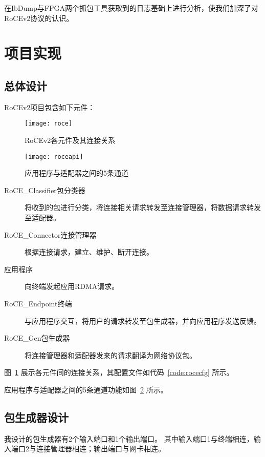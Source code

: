 在IbDump与FPGA两个抓包工具获取到的日志基础上进行分析，使我们加深了对RoCEv2协议的认识。

\section{项目实现}
\subsection{总体设计}
RoCEv2项目包含如下元件：
\begin{figure}[htbp]
\centering
\texttt{[image: roce]}
\caption{RoCEv2各元件及其连接关系} \label{fig:roce}
\end{figure}

\begin{figure}[htbp]
\centering

\end{figure}

\begin{figure}[htbp]
\centering
\texttt{[image: roceapi]}
\caption{应用程序与适配器之间的5条通道} \label{fig:roceapi}
\end{figure}

\begin{description}
\item[RoCE\_Classifier包分类器]将收到的包进行分类，将连接相关请求转发至连接管理器，将数据请求转发至适配器。
\item[RoCE\_Connector连接管理器]根据连接请求，建立、维护、断开连接。
\item[应用程序]向终端发起应用RDMA请求。
\item[RoCE\_Endpoint终端]与应用程序交互，将用户的请求转发至包生成器，并向应用程序发送反馈。
\item[RoCE\_Gen包生成器]将连接管理器和适配器发来的请求翻译为网络协议包。
\end{description}

图~\ref{fig:roce} 展示各元件间的连接关系，其配置文件如代码~\ref{code:rocecfg} 所示。

应用程序与适配器之间的5条通道功能如图~\ref{fig:roceapi} 所示。

\subsection{包生成器设计}
我设计的包生成器有2个输入端口和1个输出端口。
其中输入端口1与终端相连，输入端口2与连接管理器相连；输出端口与网卡相连。

